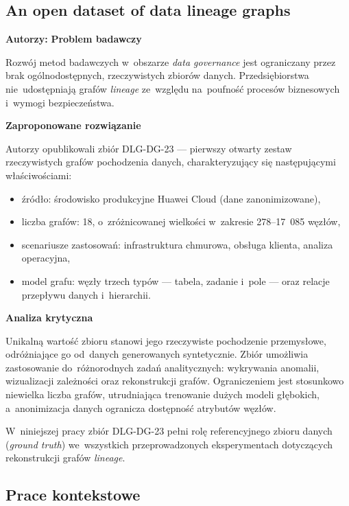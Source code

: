 \documentclass[polish,master,a4paper,oneside]{ppfcmthesis}
\begin{document}
\subsection{An open dataset of data lineage graphs }
\noindent\textbf{Autorzy: }
\noindent\textbf{Problem badawczy}

Rozwój metod badawczych w~obszarze \emph{data governance} jest ograniczany
przez brak ogólnodostępnych, rzeczywistych zbiorów danych. Przedsiębiorstwa
nie~udostępniają grafów \emph{lineage} ze~względu na~poufność procesów
biznesowych i~wymogi bezpieczeństwa.

\noindent\textbf{Zaproponowane rozwiązanie}

Autorzy opublikowali zbiór DLG-DG-23 — pierwszy otwarty zestaw
rzeczywistych grafów pochodzenia danych, charakteryzujący się następującymi
właściwościami:

\begin{itemize}
  \item źródło: środowisko produkcyjne Huawei Cloud (dane zanonimizowane),
  \item liczba grafów: 18, o~zróżnicowanej wielkości w~zakresie
        278–17~085 węzłów,
  \item scenariusze zastosowań: infrastruktura chmurowa, obsługa klienta,
        analiza operacyjna,
  \item model grafu: węzły trzech typów — tabela, zadanie i~pole — oraz
        relacje przepływu danych i~hierarchii.
\end{itemize}

\noindent\textbf{Analiza krytyczna}

Unikalną wartość zbioru stanowi jego rzeczywiste pochodzenie przemysłowe,
odróżniające go od~danych generowanych syntetycznie. Zbiór umożliwia
zastosowanie do~różnorodnych zadań analitycznych: wykrywania anomalii,
wizualizacji zależności oraz rekonstrukcji grafów. Ograniczeniem jest
stosunkowo niewielka liczba grafów, utrudniająca trenowanie dużych modeli
głębokich, a~anonimizacja danych ogranicza dostępność atrybutów węzłów.

W~niniejszej pracy zbiór DLG-DG-23 pełni rolę referencyjnego zbioru danych
(\emph{ground truth}) we~wszystkich przeprowadzonych eksperymentach
dotyczących rekonstrukcji grafów \emph{lineage}.

\subsection{Prace kontekstowe}
\end{document}
